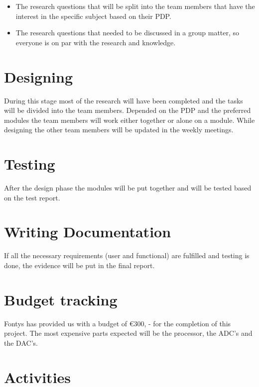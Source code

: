 \begin{itemize}
	\setlength\itemsep{-0.3em}
	\item The research questions that will be split into the team members that have the interest in the specific subject based on their PDP.
	\item The research questions that needed to be discussed in a group matter, so everyone is on par with the research and knowledge.\\
\end{itemize}



	\section{Designing}
	
During this stage most of the research will have been completed and the tasks will be divided into the team members. Depended on the PDP and the preferred modules the team members will work either together or alone on a module. While designing the other team members will be updated in the weekly meetings.  \\
	
	\section{Testing}
	
After the design phase the modules will be put together and will be tested based on the test report. \\
	
	
	\section{Writing Documentation}
	
If all the necessary requirements (user and functional) are fulfilled and testing is done, the evidence will be put in the final report. \\
	
	\section{Budget tracking}
	
Fontys has provided us with a budget of €300, - for the completion of this project. The most expensive parts expected will be the processor, the ADC’s and the DAC’s. \\

	\section{Activities}

